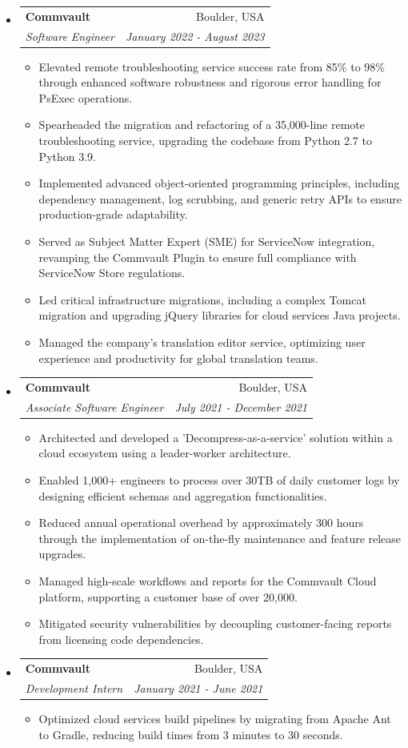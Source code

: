 \documentclass[letterpaper,11pt]{article}
\makeatletter
\newcommand{\resitem}[1]{\item #1 \vspace{-2pt}}
\newcommand{\ressubheading}[4]{
    \begin{tabular*}{6.5in}{p{4.8in}@{\extracolsep{\fill}}r}
            \textbf{#1} & #2 \\
            \textit{#3} & \textit{#4} \\
    \end{tabular*}\vspace{-8pt}}
\makeatother
\begin{document}
      \begin{itemize}
        \item \ressubheading{Commvault}{Boulder, USA}{Software Engineer}{January 2022 - August 2023}
        \begin{itemize}
            \resitem{Elevated remote troubleshooting service success rate from 85\% to 98\% through enhanced software robustness and rigorous error handling for PsExec operations.}
            \resitem{Spearheaded the migration and refactoring of a 35,000-line remote troubleshooting service, upgrading the codebase from Python 2.7 to Python 3.9.}
            \resitem{Implemented advanced object-oriented programming principles, including dependency management, log scrubbing, and generic retry APIs to ensure production-grade adaptability.}
            \resitem{Served as Subject Matter Expert (SME) for ServiceNow integration, revamping the Commvault Plugin to ensure full compliance with ServiceNow Store regulations.}
            \resitem{Led critical infrastructure migrations, including a complex Tomcat migration and upgrading jQuery libraries for cloud services Java projects.}
            \resitem{Managed the company's translation editor service, optimizing user experience and productivity for global translation teams.}
        \end{itemize}
        \item \ressubheading{Commvault}{Boulder, USA}{Associate Software Engineer}{July 2021 - December 2021}
        \begin{itemize}
            \resitem{Architected and developed a 'Decompress-as-a-service' solution within a cloud ecosystem using a leader-worker architecture.}
            \resitem{Enabled 1,000+ engineers to process over 30TB of daily customer logs by designing efficient schemas and aggregation functionalities.}
            \resitem{Reduced annual operational overhead by approximately 300 hours through the implementation of on-the-fly maintenance and feature release upgrades.}
            \resitem{Managed high-scale workflows and reports for the Commvault Cloud platform, supporting a customer base of over 20,000.}
            \resitem{Mitigated security vulnerabilities by decoupling customer-facing reports from licensing code dependencies.}
        \end{itemize}
        \item \ressubheading{Commvault}{Boulder, USA}{Development Intern}{January 2021 - June 2021}
        \begin{itemize}
            \resitem{Optimized cloud services build pipelines by migrating from Apache Ant to Gradle, reducing build times from 3 minutes to 30 seconds.}

\end{itemize}
\end{itemize}
\end{document}
